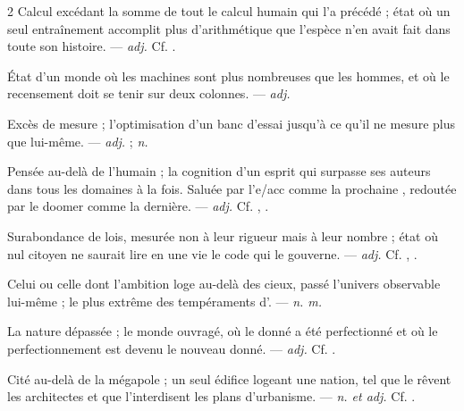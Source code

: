 \begin{multicols}{2}
 Calcul excédant la somme de tout le calcul humain qui l'a précédé ; état où un seul entraînement accomplit plus d'arithmétique que l'espèce n'en avait fait dans toute son histoire. —  \textit{adj.} Cf. .

 État d'un monde où les machines sont plus nombreuses que les hommes, et où le recensement doit se tenir sur deux colonnes.   —  \textit{adj.}

 Excès de mesure ; l'optimisation d'un banc d'essai jusqu'à ce qu'il ne mesure plus que lui-même.  —  \textit{adj.} ;  \textit{n.}

 Pensée au-delà de l'humain ; la cognition d'un esprit qui surpasse ses auteurs dans tous les domaines à la fois. Saluée par l'e/acc comme la prochaine , redoutée par le doomer comme la dernière. —  \textit{adj.} Cf. , .

 Surabondance de lois, mesurée non à leur rigueur mais à leur nombre ; état où nul citoyen ne saurait lire en une vie le code qui le gouverne. —  \textit{adj.} Cf. , .

 Celui ou celle dont l'ambition loge au-delà des cieux, passé l'univers observable lui-même ; le plus extrême des tempéraments d'.  —  \textit{n. m.}

 La nature dépassée ; le monde ouvragé, où le donné a été perfectionné et où le perfectionnement est devenu le nouveau donné. —  \textit{adj.} Cf. .

 Cité au-delà de la mégapole ; un seul édifice logeant une nation, tel que le rêvent les architectes et que l'interdisent les plans d'urbanisme. —  \textit{n. et adj.} Cf. .


\end{multicols}
